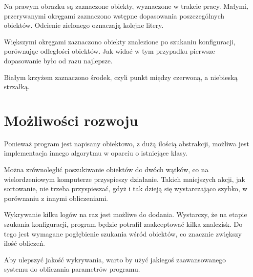 \documentclass[a4paper,12pt]{article}
\begin{document}
		Na prawym obrazku są zaznaczone obiekty, wyznaczone w trakcie pracy.
		Małymi, przerywanymi okręgami zaznaczono wstępne dopasowania poszczególnych obiektów.
		Odcienie zielonego oznaczają kolejne litery.
		
		Większymi okręgami zaznaczono obiekty znalezione po szukaniu konfiguracji, porównując odległości obiektów.
		Jak widać w tym przypadku pierwsze dopasowanie było od razu najlepsze.
		
		Białym krzyżem zaznaczono środek, czyli punkt między czerwoną, a niebieską strzałką.
		
	\section{Możliwości rozwoju}
		Ponieważ program jest napisany obiektowo, z dużą ilością abstrakcji, możliwa jest implementacja innego algorytmu w oparciu o istniejące klasy.
		
		Można zrównoleglić poszukiwanie obiektów do dwóch wątków, co na wielordzeniowym komputerze przyspieszy działanie.
		Takich mniejszych akcji, jak sortowanie, nie trzeba przyspieszać, gdyż i tak dzieją się wystarczająco szybko, w porównaniu z innymi obliczeniami.
		
		Wykrywanie kilku logów na raz jest możliwe do dodania. Wystarczy, że na etapie szukania konfiguracji, program będzie potrafił zaakceptować kilka znalezisk.
		Do tego jest wymagane pogłębienie szukania wśród obiektów, co znacznie zwiększy ilość obliczeń.
		
		Aby ulepszyć jakość wykrywania, warto by użyć jakiegoś zaawansowanego systemu do obliczania parametrów programu.
		
\end{document}
